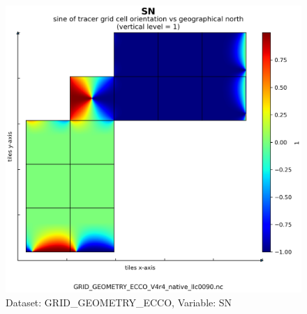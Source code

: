\begin{figure}[H]
\centering
\includegraphics[scale=0.55]{../images/plots/native_plots_coords/Geometry_Parameters_for_the_Lat-Lon-Cap_90_(llc90)_Native_Model_Grid_(Version_4_Release_4)/SN.png}
\caption{Dataset: GRID\_GEOMETRY\_ECCO, Variable: SN}
\label{tab:table-GRID_GEOMETRY_ECCO_SN-Plot}
\end{figure}
\newpage
\pagebreak
